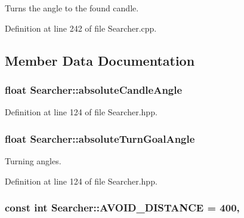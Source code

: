 Turns the angle to the found candle. 



Definition at line 242 of file Searcher.\-cpp.



\subsection{Member Data Documentation}
\hypertarget{classSearcher_a5a2d774c5f42091cbb584cfe944313d6}{
\subsubsection[{absolute\-Candle\-Angle}]{\setlength{\rightskip}{0pt plus 5cm}float Searcher\-::absolute\-Candle\-Angle\hspace{0.3cm}{\ttfamily [private]}}}\label{classSearcher_a5a2d774c5f42091cbb584cfe944313d6}


Definition at line 124 of file Searcher.\-hpp.

\hypertarget{classSearcher_aed8b034d6faa5556330af017c56f3a53}{
\subsubsection[{absolute\-Turn\-Goal\-Angle}]{\setlength{\rightskip}{0pt plus 5cm}float Searcher\-::absolute\-Turn\-Goal\-Angle\hspace{0.3cm}{\ttfamily [private]}}}\label{classSearcher_aed8b034d6faa5556330af017c56f3a53}


Turning angles. 



Definition at line 124 of file Searcher.\-hpp.

\hypertarget{classSearcher_ae0cc94f0e90c705ee21da7abf58fcc22}{
\subsubsection[{A\-V\-O\-I\-D\-\_\-\-D\-I\-S\-T\-A\-N\-C\-E}]{\setlength{\rightskip}{0pt plus 5cm}const int Searcher\-::\-A\-V\-O\-I\-D\-\_\-\-D\-I\-S\-T\-A\-N\-C\-E = 400\hspace{0.3cm}{\ttfamily [static]}, {\ttfamily [private]}}}\label{classSearcher_ae0cc94f0e90c705ee21da7abf58fcc22}


